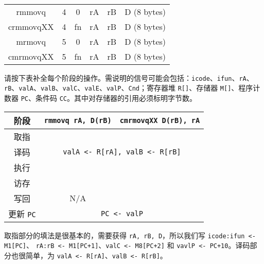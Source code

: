 \begin{problems}
        \begin{table}[H]
            \tt
            \centering
            \begin{tabular}{c|c|c|c|c|c|}
                \cline{2-6}
                rmmovq & 4 & 0 & rA & rB & D (8 bytes) \\ \cline{2-6} 
                crmmovqXX & 4 & fn & rA & rB & D (8 bytes) \\ \cline{2-6} 
                mrmovq & 5 & 0 & rA & rB & D (8 bytes) \\ \cline{2-6} 
                cmrmovqXX & 5 & fn & rA & rB & D (8 bytes) \\ \cline{2-6} 
            \end{tabular}
        \end{table}
        \qn 请按下表补全每个阶段的操作。需说明的信号可能会包括：\verb|icode|、\verb|ifun|、\verb|rA|、\verb|rB|、\verb|valA|、\verb|valB|、\verb|valC|、\verb|valE|、\verb|valP|、\verb|Cnd|；寄存器堆 \verb|R[]|、存储器 \verb|M[]|、程序计数器 \verb|PC|、条件码 \verb|CC|。其中对存储器的引用必须标明字节数。
        \begin{table}[H]
            \centering
            \begin{tabular}{|c|c|c|}
                \hline
                阶段 & {\qquad} \verb|rmmovq rA, D(rB)| {\qquad} & {\qquad} \verb|cmrmovqXX D(rB), rA| {\qquad} \\ \hline
                取指 & \multicolumn{2}{c|}{\rule{0pt}{10ex}} \\ \hline
                译码 & \multicolumn{2}{c|}{\texttt{valA <- R[rA], valB <- R[rB]}} \\ \hline
                执行 & \rule{0pt}{10ex} & \rule{0pt}{10ex} \\ \hline
                访存 & \rule{0pt}{10ex} & \rule{0pt}{10ex} \\ \hline
                写回 & N/A & \rule{0pt}{10ex} \\ \hline
                更新 \verb|PC| & \multicolumn{2}{c|}{\texttt{PC <- valP}} \\ \hline
            \end{tabular}
        \end{table}
        \sol 取指部分的填法是很基本的，需要获得 \verb|rA, rB, D|，所以我们写 \verb|icode:ifun <- M1[PC]|、 \verb|rA:rB <- M1[PC+1]|、\verb|valC <- M8[PC+2]| 和 \verb|vavlP <- PC+10|。译码部分也很简单，为 \verb|valA <- R[rA]|、\verb|valB <- R[rB]|。


\end{problems}
